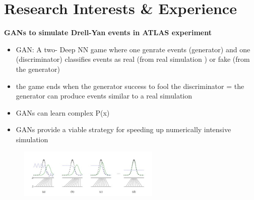 
\section{Research Interests \& Experience}


\begin{frame}{\underline{\secname}}


\begin{center}
\textbf{GANs to simulate Drell-Yan  events in  ATLAS experiment}
\end{center}

\begin{itemize}			  \setlength\itemsep{0em}

\item GAN: A two- Deep NN game where one genrate events (generator) and one (discriminator) classifies events as real (from real simulation ) or fake (from the generator)

\item the game ends when the generator success to fool the discriminator = the generator can produce events similar to a real simulation

\item GANs can learn complex P(x)

\item GANs provide a viable strategy for speeding up numerically intensive simulation

\end{itemize}
\begin{figure}[H]
\begin{center}
\includegraphics[width=0.6\textwidth]{figures/gauss.jpg}
\end{center}
\end{figure}

\end{frame}



